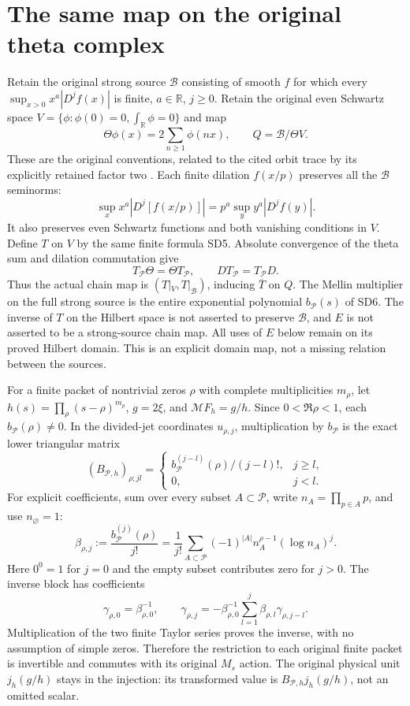 \documentclass[11pt]{article}
\newcommand{\B}{\mathscr B}
\newcommand{\M}{\mathcal M}
\begin{document}
\section{The same map on the original theta complex}
Retain the original strong source $\B$ consisting of smooth $f$ for
which every $\sup_{x>0}x^a|D^jf(x)|$ is finite, $a\in\mathbb R$,
$j\ge0$. Retain the original even Schwartz space
$V=\{\phi:\phi(0)=0,\int_\mathbb R\phi=0\}$ and map
\[
 \Theta\phi(x)=2\sum_{n\ge1}\phi(nx),\qquad Q=\B/\Theta V.
                                                               \tag{SD13}
\]
These are the original conventions, related to the cited orbit trace
by its explicitly retained factor two \cite{CCtrace,Meyer}.
Each finite dilation $f(x/p)$ preserves all the $\B$ seminorms:
\[
 \sup_x x^a|D^j[f(x/p)]|=p^a\sup_y y^a|D^jf(y)|.
\]
It also preserves even Schwartz functions and both vanishing
conditions in $V$. Define $T$ on $V$ by the same finite formula SD5.
Absolute convergence of the theta sum and dilation commutation give
\[
 T_{\mathcal P}\Theta=\Theta T_{\mathcal P},\qquad
 DT_{\mathcal P}=T_{\mathcal P}D.                             \tag{SD14}
\]
Thus the actual chain map is $(T|_V,T|_\B)$, inducing $\overline T$
on $Q$. The Mellin multiplier on the full strong source is the
entire exponential polynomial $b_{\mathcal P}(s)$ of SD6.
The inverse of $T$ on the Hilbert space is not asserted to preserve
$\B$, and $E$ is not asserted to be a strong-source chain map.
All uses of $E$ below remain on its proved Hilbert domain. This is
an explicit domain map, not a missing relation between the sources.

For a finite packet of nontrivial zeros $\rho$ with complete
multiplicities $m_\rho$, let $h(s)=\prod_\rho(s-\rho)^{m_\rho}$,
$g=2\xi$, and $\M F_h=g/h$. Since $0<\Re\rho<1$,
each $b_{\mathcal P}(\rho)\ne0$. In the divided-jet coordinates
$u_{\rho,j}$, multiplication by $b_{\mathcal P}$ is the exact
lower triangular matrix
\[
 (B_{\mathcal P,h})_{\rho;jl}=
 \begin{cases} b_{\mathcal P}^{(j-l)}(\rho)/(j-l)!,&j\ge l,\\
 0,&j<l.\end{cases}                                          \tag{SD15}
\]
For explicit coefficients, sum over every subset $A\subset\mathcal P$,
write $n_A=\prod_{p\in A}p$, and use $n_\varnothing=1$:
\[
 \beta_{\rho,j}:=\frac{b_{\mathcal P}^{(j)}(\rho)}{j!}
 =\frac1{j!}\sum_{A\subset\mathcal P}(-1)^{|A|}
          n_A^{\rho-1}(\log n_A)^j.                           \tag{SD16}
\]
Here $0^0=1$ for $j=0$ and the empty subset contributes zero for
$j>0$. The inverse block has coefficients
\[
 \gamma_{\rho,0}=\beta_{\rho,0}^{-1},\qquad
 \gamma_{\rho,j}=-\beta_{\rho,0}^{-1}
               \sum_{l=1}^j\beta_{\rho,l}\gamma_{\rho,j-l}.
                                                               \tag{SD17}
\]
Multiplication of the two finite Taylor series proves the inverse,
with no assumption of simple zeros. Therefore the restriction to
each original finite packet is invertible and commutes with its
original $M_s$ action. The original physical unit $j_h(g/h)$ stays
in the injection: its transformed value is
$B_{\mathcal P,h}j_h(g/h)$, not an omitted scalar.
\end{document}
